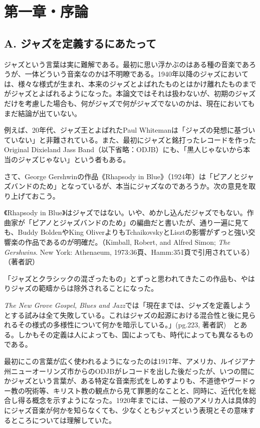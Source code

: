 \section{第一章・序論}

\subsection{A. ジャズを定義するにあたって}

ジャズという言葉は実に難解である。最初に思い浮かぶのはある種の音楽であろうが、一体どういう音楽なのかは不明瞭である。1940年以降のジャズにおいては、様々な様式が生まれ、本来のジャズとよばれたものとはかけ離れたものまでがジャズとよばれるようになった。本論文ではそれは扱わないが、初期のジャズだけを考慮した場合も、何がジャズで何がジャズでないのかは、現在においてもまだ結論が出ていない。

例えば、20年代、ジャズ王とよばれたPaul Whitemanは「ジャズの発想に基づいていない」と非難されている。また、最初にジャズと銘打ったレコードを作ったOriginal Dixieland Jass Band（以下省略：ODJB）にも、「黒人じゃないから本当のジャズじゃない」という者もある。

さて、George Gershwinの作品《Rhapsody in Blue》（1924年）は「ピアノとジャズバンドのため」となっているが、本当にジャズなのであろうか。次の意見を取り上げておこう。

\begin{gquote}
《Rhapsody in Blue》はジャズではない。いや、めかし込んだジャズでもない。作曲家が「ピアノとジャズバンドのため」の編曲だと書いたが、通り一遍に見ても、Buddy BoldenやKing OliverよりもTchaikovskyとLisztの影響がずっと強い交響楽の作品であるのが明確だ。（Kimball, Robert, and Alfred Simon; \textit{The Gershwins}. New York: Athenaeum, 1973:36頁、Hamm:351頁で引用されている）（著者訳）
\end{gquote}

「ジャズとクラシックの混ざったもの」とずっと思われてきたこの作品も、やはりジャズの範疇からは除外されることになった。

\textit{The New Grove Gospel, Blues and Jazz}では「現在までは、ジャズを定義しようとする試みは全て失敗している。これはジャズの起源における混合性と後に見られるその様式の多様性について何かを暗示している。」(pg.223, 著者訳)　とある。しかもその定義は人によっても、国によっても、時代によっても異なるものである。

最初にこの言葉が広く使われるようになったのは1917年、アメリカ、ルイジアナ州ニューオーリンズ市からのODJBがレコードを出した後だったが、いつの間にかジャズという言葉が、ある特定な音楽形式をしめすよりも、不道徳やヴードゥー教の呪術等、キリスト教の観点から見て罪悪的なことと、同時に、近代化を総合し得る概念を示すようになった。1920年までには、一般のアメリカ人は具体的にジャズ音楽が何かを知らなくても、少なくともジャズという表現とその意味するところについては理解していた。


